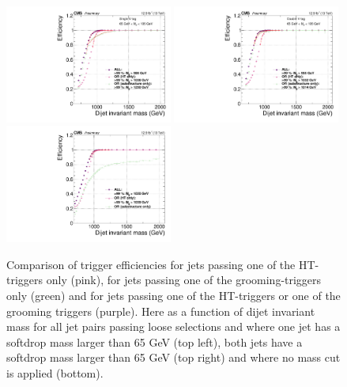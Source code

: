 \begin{figure}[h!]
\centering
\includegraphics[width=0.49\textwidth]{figures/analysis/search2/AN-16-235/plots/triggereffMjj-ALL_SingleTag.pdf}
\includegraphics[width=0.49\textwidth]{figures/analysis/search2/AN-16-235/plots/triggereffMjj-ALL_DoubleTag.pdf}\\
\includegraphics[width=0.49\textwidth]{figures/analysis/search2/AN-16-235/plots/triggereffMjj-ALL_noTag.pdf}

\caption{Comparison of trigger efficiencies for jets passing one of the HT-triggers only (pink), for jets passing one of the grooming-triggers only (green) and for jets passing one of the HT-triggers or one of the grooming triggers (purple). Here as a function of dijet invariant mass for all jet pairs passing loose selections and where one jet has a softdrop mass larger than 65 GeV (top left), both jets have a softdrop mass larger than 65 GeV (top right) and where no mass cut is applied (bottom). }
\label{fig:searchII:trigger-fits}
\end{figure}

